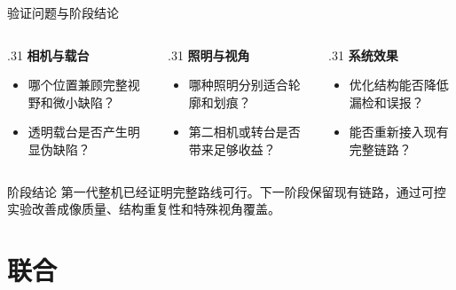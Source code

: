 \documentclass[aspectratio=169,10pt]{beamer}
\begin{document}
\begin{frame}{验证问题与阶段结论}
  \begin{columns}[T,onlytextwidth]
    \begin{column}{.31\textwidth}
      \textbf{相机与载台}
      \begin{itemize}
        \item 哪个位置兼顾完整视野和微小缺陷？
        \item 透明载台是否产生明显伪缺陷？
      \end{itemize}
    \end{column}
    \begin{column}{.31\textwidth}
      \textbf{照明与视角}
      \begin{itemize}
        \item 哪种照明分别适合轮廓和划痕？
        \item 第二相机或转台是否带来足够收益？
      \end{itemize}
    \end{column}
    \begin{column}{.31\textwidth}
      \textbf{系统效果}
      \begin{itemize}
        \item 优化结构能否降低漏检和误报？
        \item 能否重新接入现有完整链路？
      \end{itemize}
    \end{column}
  \end{columns}

  \vspace{1em}
  \begin{block}{阶段结论}
    第一代整机已经证明完整路线可行。下一阶段保留现有链路，通过可控实验改善成像质量、结构重复性和特殊视角覆盖。
  \end{block}
\end{frame}

\section{联合}
\end{document}

